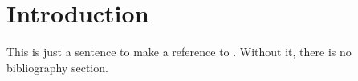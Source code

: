 \section{Introduction}
This is just a sentence to make a reference to \cite{frey}. Without it, there is no bibliography section.
\lipsum[2]